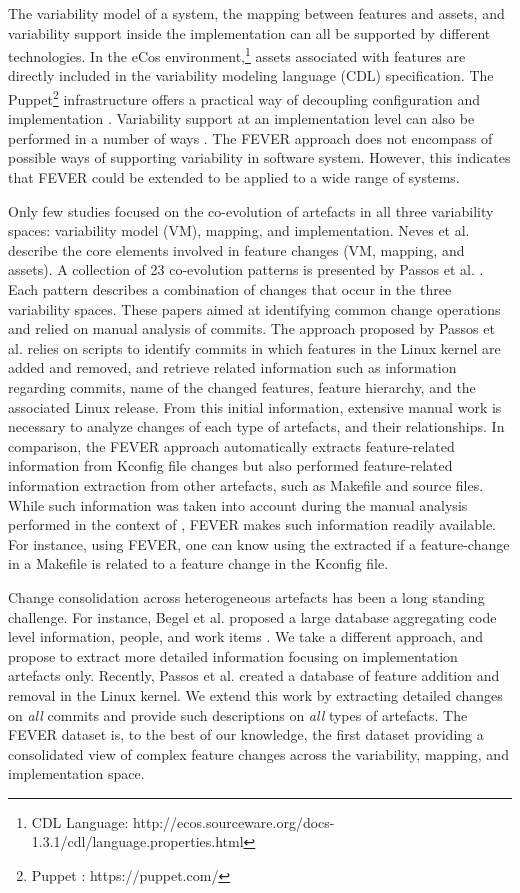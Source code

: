 The variability model of a system, the mapping between features and assets, and variability support inside the implementation
can all be supported by different technologies.
In the eCos environment,\footnote{CDL Language: http://ecos.sourceware.org/docs-1.3.1/cdl/language.properties.html} 
assets associated with features are directly included in the 
variability modeling language (CDL) specification.
The Puppet\footnote{Puppet : https://puppet.com/} infrastructure offers a practical way of decoupling configuration
and implementation \citep{sharma_does_2016}.
Variability support at an implementation level can also be performed in a number of ways \citep{kastner_integrating_2008}.
The FEVER approach does not encompass of possible ways of supporting variability in software system.
However, this indicates that FEVER could be extended to be applied to a wide range of systems. 

Only few studies focused on the co-evolution of artefacts in all three variability spaces: variability model (VM), mapping, and implementation.
Neves et al. \citep{neves_safe_2015} describe the core elements involved in feature changes (VM, mapping, and assets).
A collection of 23 co-evolution patterns is presented by Passos et al. \citep{passos_coevolution_2015}. 
Each pattern describes a combination of changes that occur in the three variability spaces.
These papers aimed at identifying common change operations and relied on manual analysis of commits.
The approach proposed by Passos et al. relies on scripts to identify commits in which features in the Linux kernel are added and removed, and retrieve related information such as
information regarding commits, name of the changed features, feature hierarchy, and the associated Linux release.
From this initial information, extensive manual work is necessary to analyze changes of each type of artefacts, and their relationships.
In comparison, the FEVER approach automatically extracts feature-related information from Kconfig file changes but also performed feature-related information extraction from other artefacts, such as Makefile and source files. While such information was 
taken into account during the manual analysis performed in the context of \citep{passos_coevolution_2015}, FEVER makes such information readily available.
For instance, using FEVER, one can know using the extracted if a feature-change in a Makefile is related to a feature change in the Kconfig file.

Change consolidation across heterogeneous artefacts has been a long standing challenge.
For instance, Begel et al. proposed a large database aggregating code level information, people, and work items \citep{begel_codebook:_2010}.
We take a different approach, and propose to extract more detailed information focusing on implementation artefacts only.
Recently, Passos et al. created a database of feature addition and removal \citep{passos_dataset_2014} in the Linux kernel.
We extend this work by extracting detailed changes on \emph{all} commits and provide such descriptions on \emph{all} types of artefacts.
The FEVER dataset is, to the best of our knowledge, the first dataset providing a consolidated view of complex feature changes
across the variability, mapping, and implementation space.

